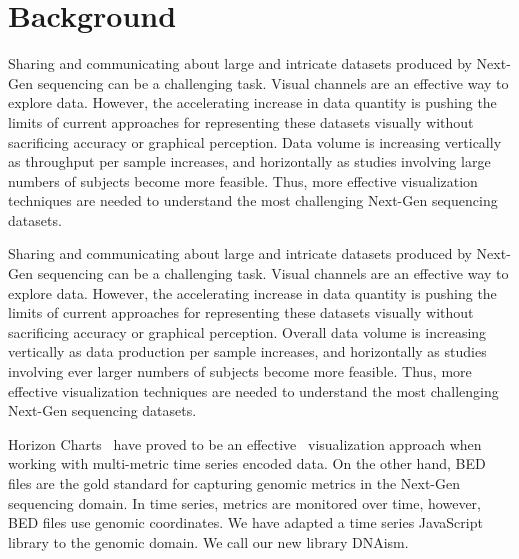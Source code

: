\documentclass[twocolumn]{bmcart}
\begin{document}
\section*{Background}

Sharing and communicating about large and intricate datasets produced by
Next-Gen sequencing can be a challenging task. Visual channels are an effective
way to explore data. However, the accelerating increase in data quantity is
pushing the limits of current approaches for representing these datasets
visually without sacrificing accuracy or graphical perception.  Data volume is
increasing vertically as throughput per sample increases, and horizontally as
studies involving large numbers of subjects become more feasible.  Thus, more
effective visualization techniques are needed to understand the most
challenging Next-Gen sequencing datasets.

Sharing and communicating about large and intricate datasets produced by
Next-Gen sequencing can be a challenging task. Visual channels are an effective
way to explore data. However, the accelerating increase in data quantity is
pushing the limits of current approaches for representing these datasets
visually without sacrificing accuracy or graphical perception.  Overall data
volume is increasing vertically as data production per sample
increases, and horizontally as studies involving ever larger numbers of
subjects become more feasible.  Thus, more effective visualization techniques
are needed to understand the most challenging Next-Gen sequencing datasets.


Horizon Charts~\cite{time-in-the-horizon} have proved to be an
effective~\cite{2009-horizon} visualization approach when working with
multi-metric time series encoded data.  On the other hand, BED files are the
gold standard for capturing genomic metrics in the Next-Gen sequencing domain.
In time series, metrics are monitored over time, however, BED files use genomic
coordinates. We have adapted a time series JavaScript library to the genomic
domain. We call our new library DNAism.
\end{document}
